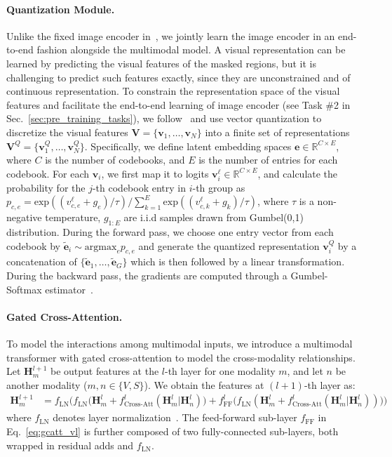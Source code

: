 \documentclass{article}
\begin{document}
	\paragraph{Quantization Module.}
	Unlike the {fixed image encoder} in~\cite{selfdoc2021}, we jointly learn the image encoder {in an end-to-end fashion} {alongside the multimodal model.} {{A visual} representation can be learned by predicting the visual
		features of the masked regions, but it is challenging to predict such features {exactly, since they} are unconstrained and of continuous representation.} To {{constrain the representation space of the visual features} and {facilitate} the end-to-end learning of image encoder (see Task \#2 in Sec.~\ref{sec:pre_training_tasks})}, {we follow~\cite{oord2017neural,baevski2020wav2vec} and use} vector quantization to discretize the visual features {$\mathbf{V} = \{\bm{v}_1,\ldots, \bm{v}_N\}$} {in}to a finite set of representations {$\mathbf{V}^Q=\{\bm{v}_1^Q,\ldots, \bm{v}_N^Q\}$}.
Specifically, we define latent embedding spaces {$\bm{e}\in \mathbb{R}^{C\times E}$}, where $C$ is the number of codebooks, and $E$ is the number of entries for each codebook. For each {$\bm{v}_i$}, we first map it to logits {$\bm{v}^{\ell}_i\in \mathbb{R}^{C\times E}$}, and calculate the probability for the $j$-th codebook entry in $i$-th group as $p_{c,e} = \text{exp}((v^{\ell}_{c,e} + g_e)/\tau)/\sum_{k = 1}^{E} \text{exp}((v^{\ell}_{c,k} + g_k)/\tau)$, where $\tau$ is a non-negative temperature, $g_{1:E}$ are i.i.d samples drawn from  Gumbel(0,1) distribution. During the forward pass, we choose one entry vector from each codebook by {$\bm{\tilde{e}}_i\sim \text{argmax}_e p_{c,e}$} and generate the quantized representation {$\bm{v}^Q_i$} by a concatenation of {$\{{\bm{\tilde{e}}_1,\ldots, \bm{\tilde{e}}_G}\}$} {which is then followed by} a linear transformation. During the backward pass, the gradients are {computed through a} Gumbel-Softmax estimator~\cite{jang2016categorical}.
	
	\paragraph{Gated Cross-Attention.}
	To model the {interactions among} multimodal inputs, we introduce {a} multimodal transformer {with gated cross-attention to model the cross-modality relationships.}
	{Let $\mathbf{H}_m^{l+1}$ be output features at the $l$-th layer for one modality $m$, and {let} $n$ be another modality ($m, n \in \{V, S\}$). We obtain the features at $(l+1)$-th layer as}:
	\begin{align}
		\mathbf{H}_m^{l+1} &= f_{\text{LN}} \Big(f_{\text{LN}} \big(\mathbf{H}_m^{l} + f_{\text{Cross-Att}}^l(\mathbf{H}_m^l| \mathbf{H}_n^l)\big) +  f_{\text{FF}}^l \big(f_{\text{LN}}(\mathbf{H}_m^{l} + f_{\text{Cross-Att}}^l(\mathbf{H}_m^l| \mathbf{H}_n^l))\big)\Big)\label{eq:gcatt_vl}
	\end{align}
	{where $f_{\text{LN}}$ denotes layer normalization~\cite{ba2016layer}}.
	{The feed-forward sub-layer $f_{\text{FF}}$ in Eq.~\ref{eq:gcatt_vl} is further composed of two fully-connected sub-layers, both wrapped in residual adds and $f_{\text{LN}}$.}
	
\end{document}
